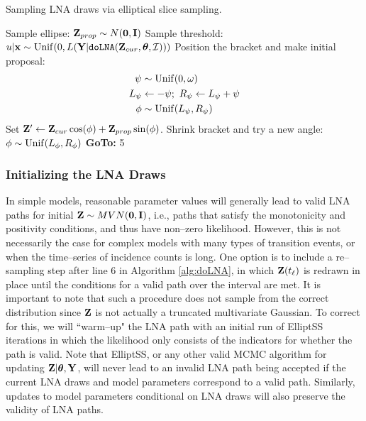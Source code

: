 \begin{algorithm}[htbp]
	\caption{Sampling LNA draws via elliptical slice sampling.}
	\label{alg:elliptss_lna}
	\begin{algorithmic}[1]
		\State Sample ellipse: $ \mathbf{Z}_{prop} \sim N(\boldsymbol{0}, \mathbf{I}) $
		\State Sample threshold: $ u|\mathbf{x} \sim \mathrm{Unif}(0, L(\mathbf{Y}|\texttt{doLNA}(\mathbf{Z}_{cur},\boldsymbol{\theta},\mathcal{I}))) $
		\State Position the bracket and make initial proposal: \vspace{-0.1in}
		\begin{align*}
		\psi &\sim \mathrm{Unif}(0,\omega)\\
		L_\psi &\leftarrow -\psi;\ R_\psi \leftarrow L_\psi + \psi\\
		\phi &\sim \mathrm{Unif}(L_\psi,R_\psi)
		\end{align*}
		\State Set $ \mathbf{Z}' \leftarrow \mathbf{Z}_{cur}\cos(\phi) + \mathbf{Z}_{prop}\sin(\phi) $. 
		\State{}
		\Else
		\State Shrink bracket and try a new angle:
		\State $ \phi \sim \mathrm{Unif}(L_\phi, R_\phi) $
		\State \textbf{GoTo:} 5
		\EndIf
		\EndProcedure
	\end{algorithmic}
\end{algorithm}

\subsubsection{Initializing the LNA Draws}
\label{subsubsec:lna_init}
In simple models, reasonable parameter values will generally lead to valid LNA paths for initial $ \mathbf{Z}\sim MVN(\boldsymbol{0},\mathbf{I}) $, i.e., paths that satisfy the monotonicity and positivity conditions, and thus have non--zero likelihood. However, this is not necessarily the case for complex models with many types of transition events, or when the time--series of incidence counts is long. One option is to include a re--sampling step after line 6 in Algorithm \ref{alg:doLNA}, in which $ \mathbf{Z}(t_\ell) $ is redrawn in place until the conditions for a valid path over the interval are met. It is important to note that such a procedure does not sample from the correct distribution since $ \mathbf{Z} $ is not actually a truncated multivariate Gaussian. To correct for this, we will ``warm--up" the LNA path with an initial run of ElliptSS iterations in which the likelihood only consists of the indicators for whether the path is valid. Note that ElliptSS, or any other valid MCMC algorithm for updating $ \mathbf{Z}|\boldsymbol{\theta},\mathbf{Y} $, will never lead to an invalid LNA path being accepted if the current LNA draws and model parameters correspond to a valid path. Similarly, updates to model parameters conditional on LNA draws will also preserve the validity of LNA paths.

